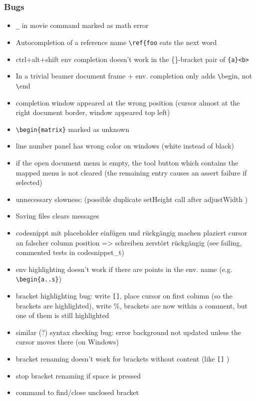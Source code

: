 \documentclass[10pt,a4paper,landscape]{report}
\begin{document}
\subsubsection{Bugs}
\begin{itemize}
\item \verb+_+ in movie command marked as math error
\item Autocompletion of a reference name \verb+\ref{foo+ eats the next word
\item ctrl+alt+shift env completion doesn't work in the \{\}-bracket pair of \verb+{a}<b>+ 
\item In a trivial beamer document frame + env. completion only adds \verb+\+begin, not \verb+\+end
\item completion window appeared at the wrong position (cursor almost at the right document border, window appeared top left)
\item \verb+\begin{matrix}+ marked as unknown
\item line number panel has wrong color on windows (white instead of black) 
\item if the open document menu is empty, the tool button which contains the mapped menu is not cleared (the remaining entry causes an assert failure if selected)
\item unnecessary slowness: (possible duplicate setHeight call after adjustWidth )
\item  Saving files clears messages
\item codesnippt mit placeholder einfügen und rückgängig machen plaziert cursor an falscher column position => schreiben zerstört rückgängig (see failing, commented tests in codesnippet\_t)
\item  env highlighting doesn't work if there are points in the env. name (e.g. \verb+\begin{a..s}+)
\item bracket highlighting bug: write \verb+[]+, place cursor on first column (so the brackets are highlighted), write \%, brackets are now within a comment, but one of them is still highlighted
\item similar (?) syntax checking bug: error background not updated unless the cursor moves there (on Windows)
\item bracket renaming doesn't work for brackets without content (like \verb+[]+ )
\item stop bracket renaming if space is pressed
\item command to find/close unclosed bracket

\end{itemize}
\end{document}
